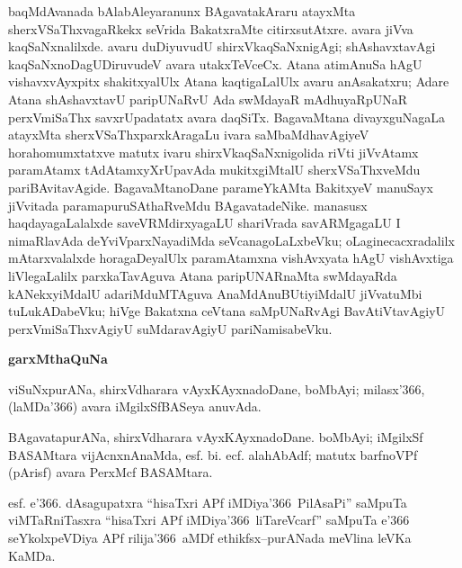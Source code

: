 baqMdAvanada bAlabAleyaranunx BAgavatakAraru atayxMta sherxVSaThxvagaRkekx seVrida BakatxraMte citirxsutAtxre. avara jiVva kaqSaNxnalilxde. avaru duDiyuvudU shirxVkaqSaNxnigAgi; shAshavxtavAgi kaqSaNxnoDagUDiruvudeV avara utakxTeVceCx. Atana atimAnuSa hAgU vishavxvAyxpitx shakitxyalUlx Atana kaqtigaLalUlx avaru anAsakatxru; Adare Atana shAshavxtavU paripUNaRvU Ada swMdayaR mAdhuyaRpUNaR perxVmiSaThx savxrUpadatatx avara daqSiTx. BagavaMtana divayxguNagaLa atayxMta sherxVSaThxparxkAragaLu ivara saMbaMdhavAgiyeV hora\-homumxtatxve matutx ivaru shirxVkaqSaNxnigolida riVti jiVvAtamx paramAtamx tAdAtamxyX\-rUpa\-vAda mukitxgiMtalU sherxVSaThxveMdu pariBAvitavAgide. BagavaMtanoDane parameYkAMta BakitxyeV manuSayx jiVvitada paramapuruSAthaRveMdu BAgavatadeNike. manasusx haqdayagaLalalxde saveVRMdirxyagaLU shariVrada savARMgagaLU I nimaRlavAda deYviV\-parxNayadiMda seVcanagoLaLxbeVku; oLaginecacxradalilx mAtarxvalalxde horagaDeyalUlx para\-mAtamxna vishAvxyata hAgU vishAvxtiga liVlegaLalilx parxkaTavAguva Atana paripUNARnaMta swMdayaRda kANekxyiMdalU adariMduMTAguva AnaMdAnuBUtiyiMdalU jiVvatuMbi tuLukADabeVku; hiVge Bakatxna ceVtana saMpUNaRvAgi BavAtiVtavAgiyU perxVmiSaThxvAgiyU suMdaravAgiyU pariNamisabeVku. 

\theendnotes
{}

\vskip 1cm

\begin{center}
{\Large\bf garxMthaQuNa}
\end{center}

\smallskip
viSuNxpurANa, shirxVdharara vAyxKAyxnadoDane, boMbAyi; milasx\char'366, (laMDa\char'366) avara iMgilxSfBASeya anuvAda.

\smallskip
BAgavatapurANa, shirxVdharara vAyxKAyxnadoDane. boMbAyi; iMgilxSf BASAMtara vijAcnxnAnaMda, esf. bi. ecf. alahAbAdf; matutx barfnoVPf (pArisf) avara PerxMcf BASAMtara.

\smallskip
esf. e\char'366. dAsagupatxra ``hisaTxri APf iMDiya\char'366\ PilAsaPi'' saMpuTa  viMTaRniTasxra ``hisaTxri APf iMDiya\char'366\ liTareVcarf'' saMpuTa  e\char'366 seYkolxpeVDiya APf rilija\char'366\ aMDf ethikfsx--purANada meVlina leVKa KaMDa.
